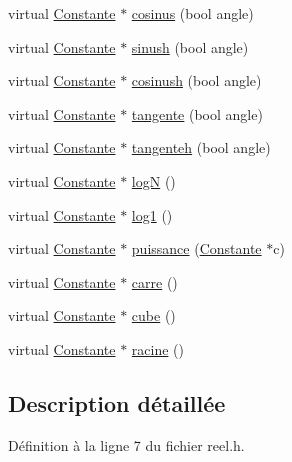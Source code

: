 \begin{DoxyCompactItemize}
\item 
virtual \hyperlink{class_constante}{\-Constante} $\ast$ \hyperlink{class_reel_a2ac819db4ede5a6ee712c33ae6a454ae}{cosinus} (bool angle)
\item 
virtual \hyperlink{class_constante}{\-Constante} $\ast$ \hyperlink{class_reel_a9bffd052bb8d163e1f0b7c1f86b27c1a}{sinush} (bool angle)
\item 
virtual \hyperlink{class_constante}{\-Constante} $\ast$ \hyperlink{class_reel_a355737e3925c2352f4e7fdfe16755f05}{cosinush} (bool angle)
\item 
virtual \hyperlink{class_constante}{\-Constante} $\ast$ \hyperlink{class_reel_acaeed5fe69edf50145bb355a88ebf372}{tangente} (bool angle)
\item 
virtual \hyperlink{class_constante}{\-Constante} $\ast$ \hyperlink{class_reel_a9184526f7eefa9a83f5394393ce86911}{tangenteh} (bool angle)
\item 
virtual \hyperlink{class_constante}{\-Constante} $\ast$ \hyperlink{class_reel_ad793874a4f9bf2f12889a085f705ab3b}{log\-N} ()
\item 
virtual \hyperlink{class_constante}{\-Constante} $\ast$ \hyperlink{class_reel_ae006122aff6f67f662affe4ac7686962}{log1} ()
\item 
virtual \hyperlink{class_constante}{\-Constante} $\ast$ \hyperlink{class_reel_af88c9ab592354cfdcfe821f35e1d56af}{puissance} (\hyperlink{class_constante}{\-Constante} $\ast$c)
\item 
virtual \hyperlink{class_constante}{\-Constante} $\ast$ \hyperlink{class_reel_ad658ce7744a0b152c7f42ffd3c79baaf}{carre} ()
\item 
virtual \hyperlink{class_constante}{\-Constante} $\ast$ \hyperlink{class_reel_af8c335c6e20697e9adb9fbb4e5f4577b}{cube} ()
\item 
virtual \hyperlink{class_constante}{\-Constante} $\ast$ \hyperlink{class_reel_a164e9b499ff9c5521d59a5f6e607c409}{racine} ()
\end{DoxyCompactItemize}


\subsection{\-Description détaillée}


\-Définition à la ligne 7 du fichier reel.\-h.



